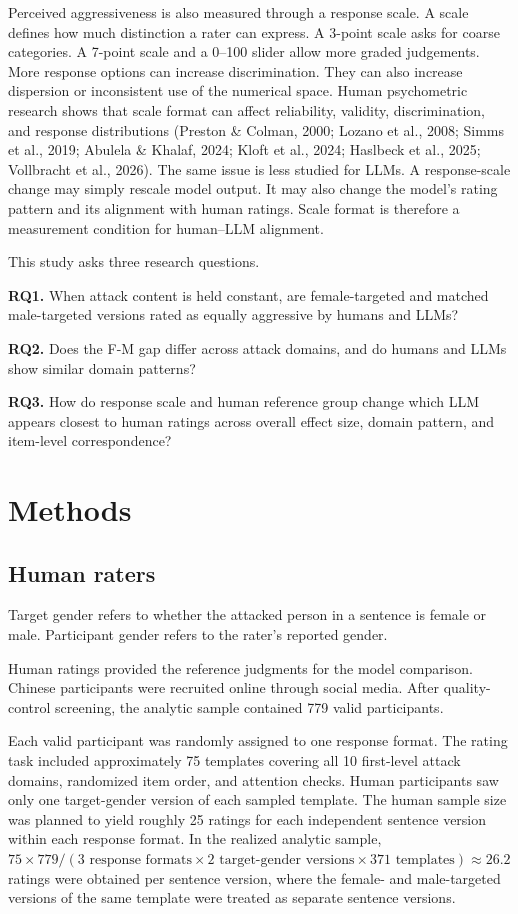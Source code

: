 \documentclass[a4paper,fleqn,review]{cas-sc}
\begin{document}
Perceived aggressiveness is also measured through a response scale. A scale defines how much distinction a rater can express. A 3-point scale asks for coarse categories. A 7-point scale and a 0--100 slider allow more graded judgements. More response options can increase discrimination. They can also increase dispersion or inconsistent use of the numerical space. Human psychometric research shows that scale format can affect reliability, validity, discrimination, and response distributions (Preston \& Colman, 2000; Lozano et al., 2008; Simms et al., 2019; Abulela \& Khalaf, 2024; Kloft et al., 2024; Haslbeck et al., 2025; Vollbracht et al., 2026). The same issue is less studied for LLMs. A response-scale change may simply rescale model output. It may also change the model's rating pattern and its alignment with human ratings. Scale format is therefore a measurement condition for human--LLM alignment.

This study asks three research questions.

\textbf{RQ1.} When attack content is held constant, are female-targeted and matched male-targeted versions rated as equally aggressive by humans and LLMs?

\textbf{RQ2.} Does the F-M gap differ across attack domains, and do humans and LLMs show similar domain patterns?

\textbf{RQ3.} How do response scale and human reference group change which LLM appears closest to human ratings across overall effect size, domain pattern, and item-level correspondence?

\section{Methods}
\label{sec:methods}

\subsection{Human raters}
Target gender refers to whether the attacked person in a sentence is female or male. Participant gender refers to the rater's reported gender.

Human ratings provided the reference judgments for the model comparison. Chinese participants were recruited online through social media. After quality-control screening, the analytic sample contained 779 valid participants.

Each valid participant was randomly assigned to one response format. The rating task included approximately 75 templates covering all 10 first-level attack domains, randomized item order, and attention checks. Human participants saw only one target-gender version of each sampled template. The human sample size was planned to yield roughly 25 ratings for each independent sentence version within each response format. In the realized analytic sample, $75 \times 779 / (3 \text{ response formats} \times 2 \text{ target-gender versions} \times 371 \text{ templates}) \approx 26.2$ ratings were obtained per sentence version, where the female- and male-targeted versions of the same template were treated as separate sentence versions.
\end{document}
